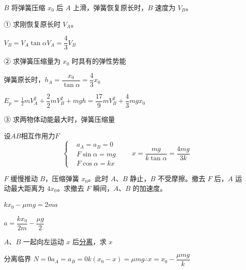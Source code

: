 \begin{problem}[{[3]}]
$B$ 将弹簧压缩 $x_0$ 后 $A$ 上滑，弹簧恢复原长时，$B$ 速度为 $V_B$。

\noindent ① 求刚恢复原长时 $V_A$。

\noindent $V_B=V_A\tan\alpha$\qquad $V_A=\dfrac43V_B$

\noindent ② 求弹簧压缩量为 $x_0$ 时具有的弹性势能

\noindent 弹簧原长时，$h_A=\dfrac{x_0}{\tan\alpha}=\dfrac43x_0$

\noindent $E_p=\tfrac12mV_A^{2}+\dfrac{2}{2}mV_B^{2}+mgh=\dfrac{17}{9}mV_B^{2}+\dfrac43mgx_0$

\noindent ③ 求两物体动能最大时，弹簧压缩量

\noindent 设$AB$相互作用力$F$
\[
\left\{\begin{aligned}
&a_A=a_B=0\\
&F\sin\alpha=mg\\
&F\cos\alpha=kx
\end{aligned}\right.\qquad x=\frac{mg}{k\tan\alpha}=\frac{4mg}{3k}
\]
\end{problem}
\begin{problem}[{[4]}]
$F$ 缓慢推动 $B$，压缩弹簧 $x_0$。此时 $A$、$B$ 静止，$B$ 不受摩擦。撤去 $F$ 后，$A$ 运动最大距离为 $4x_0$。求撤去 $F$ 瞬间，$A$、$B$ 的加速度。

\noindent $kx_0-\mu mg=2ma$%

\noindent $a=\dfrac{kx_0}{2m}-\dfrac{\mu g}{2}$

\noindent $A$、$B$ 一起向左运动 $x$ 后\underline{分离}，求 $x$%

\noindent 分离临界 $N=0$\quad $a_A=a_B=0$\qquad $k(x_0-x)=\mu mg$\qquad $\therefore x=x_0-\dfrac{\mu mg}{k}$
\end{problem}
